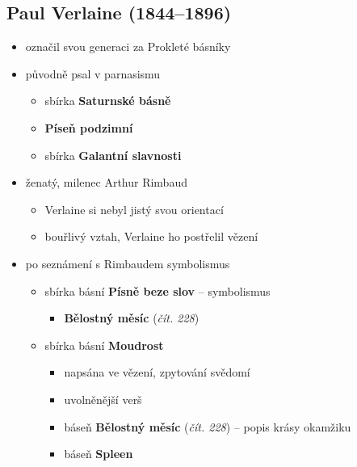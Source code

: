 \subsection{Paul Verlaine (1844--1896)}
\begin{itemize}
\item označil svou generaci za Prokleté básníky
\item původně psal v parnasismu
	\begin{itemize}
	\item sbírka \textbf{Saturnské básně}
		\item \textbf{Píseň podzimní}
	\item sbírka \textbf{Galantní slavnosti}
	\end{itemize}
\item ženatý, milenec Arthur Rimbaud
	\begin{itemize}
	\item Verlaine si nebyl jistý svou orientací
	\item bouřlivý vztah, Verlaine ho postřelil \ra vězení
	\end{itemize}
\item po seznámení s Rimbaudem symbolismus
	\begin{itemize}
	\item sbírka básní \textbf{Písně beze slov} -- symbolismus
		\begin{itemize}
		\item \textbf{Bělostný měsíc} (\textit{čít. 228})
		\end{itemize}
	\item sbírka básní \textbf{Moudrost}
		\begin{itemize}
		\item napsána ve vězení, zpytování svědomí
		\item uvolněnější verš 
		\item báseň \textbf{Bělostný měsíc} (\textit{čít. 228}) -- popis krásy okamžiku
		\item báseň \textbf{Spleen}
		\end{itemize}
	\end{itemize}
\end{itemize}

